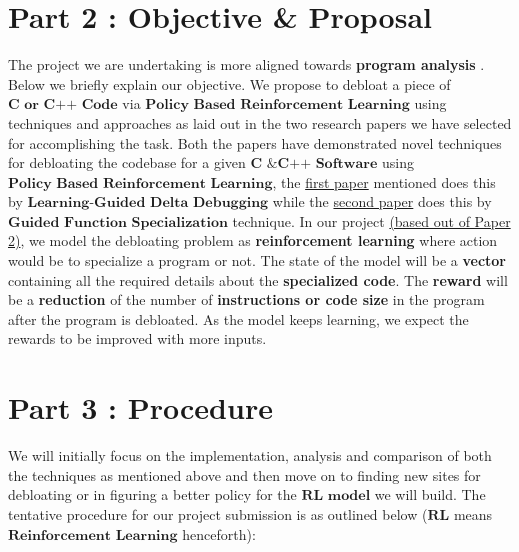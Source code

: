 \documentclass{article} %
\begin{document}
\section*{Part 2 : Objective \& Proposal}
The project we are undertaking is more aligned towards \color{blue} \textbf{program analysis} \color{black}. Below we briefly explain our objective. 
We propose to debloat a piece of $\textbf{C or C++ Code}$ via $\textbf{Policy Based Reinforcement Learning}$ using techniques and approaches as laid out in the two research papers we have selected for accomplishing the task. Both the papers have demonstrated novel techniques for debloating the codebase for a given $\textbf{C \& C++ Software}$ using $\textbf{Policy Based Reinforcement Learning}$, the \href{https://dl.acm.org/doi/10.1145/3243734.3243838}{first paper} mentioned does this by $\textbf{Learning-Guided Delta Debugging}$  while the \href{http://www.csl.sri.com/users/gehani/papers/MLSys-2019.DeepOCCAM.pdf}{second paper} does this by $\textbf{Guided Function Specialization}$ technique. In our project \href{http://www.csl.sri.com/users/gehani/papers/MLSys-2019.DeepOCCAM.pdf}{(based out of Paper 2)}, we model the debloating problem as \textbf{reinforcement learning} where action would be to specialize a program or not. The state of the model will be a \textbf{vector} containing all the required details about the \textbf{specialized code}. The \textbf{reward} will be a \textbf{reduction} of the number of \textbf{instructions or code size} in the program after the program is debloated. As the model keeps learning, we expect the rewards to be improved with more inputs. 

\section*{Part 3 : Procedure}
We will initially focus on the implementation, analysis and comparison of both the techniques as mentioned above and then move on to finding new sites for debloating or in figuring a better policy for the $\textbf{RL model}$ we will build. The tentative procedure for our project submission is as outlined below ($\textbf{RL}$ means $\textbf{Reinforcement Learning}$ henceforth):
\end{document}
